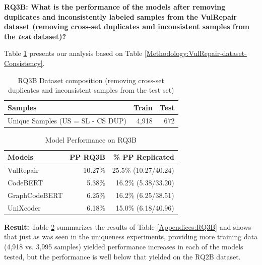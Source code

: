 \textbf{RQ3B: What is the performance of the models after removing duplicates and inconsistently labeled samples from the VulRepair dataset (removing cross-set duplicates and inconsistent samples from the \emph{test} dataset)?}

Table \ref{Methodology:RQ3B--removed-samples-with-multilple-CWEs} presents our analysis based on Table \ref{Methodology:VulRepair-dataset-Consistency}.

\begin{table}[h]
\centering
  \caption{RQ3B Dataset composition (removing cross-set duplicates and inconsistent samples from the test set)}
  \label{Methodology:RQ3B--removed-samples-with-multilple-CWEs}
  \begin{tabular}{|l|r|r|}
    \hline
    Samples &Train &Test\\
    \hline
    Unique Samples (US = SL - CS DUP)                    &4,918   &672\\
  \hline
\end{tabular}
\end{table}


\begin{table}[h]
\centering
  \caption{Model Performance on RQ3B}
  \label{Methodology:RQ3B-dataset-ModelPerformance}
  \begin{tabular}{|l|r|r|}
    \hline
    Models          & PP RQ3B & \% PP Replicated\\
    \hline
    VulRepair       & 10.27\% & 25.5\% (10.27/40.24)\\
    \hline
    CodeBERT        & 5.38\% & 16.2\% \enspace(5.38/33.20)\\
    \hline
    GraphCodeBERT   & 6.25\% & 16.2\% \enspace(6.25/38.51)\\
    \hline
    UniXcoder       & 6.18\% & 15.0\% \enspace(6.18/40.96)\\
  \hline
\end{tabular}
\end{table}

\textbf{Result:}
Table \ref{Methodology:RQ3B-dataset-ModelPerformance} summarizes the results of Table \ref{Appendices:RQ3B} and shows that just as was seen in the uniqueness experiments, providing more training data (4,918 vs. 3,995 samples) yielded performance increases in each of the models tested, but the performance is well below that yielded on the RQ2B dataset.




